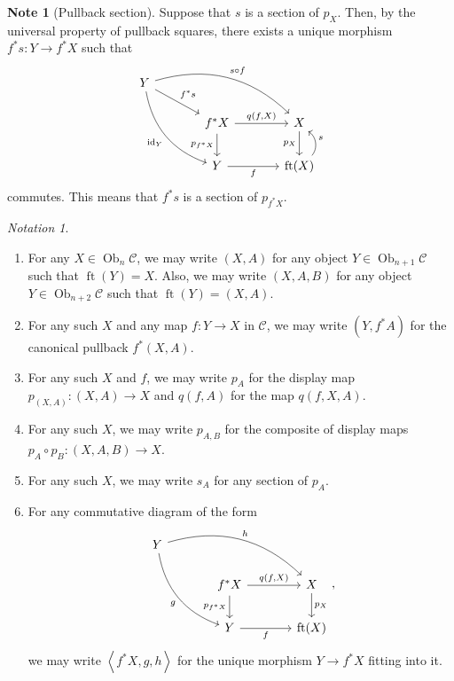 \documentclass[10pt,letterpaper,cm]{nupset}
\theoremstyle{definition}
\newtheorem{note}[definition]{Note}
\theoremstyle{theorem}
\theoremstyle{remark}
\newtheorem*{notation}{Notation}
\DeclareMathOperator{\ft}{ft}
\DeclareMathOperator{\ob}{Ob}
\newcommand{\0}{\mathbf{0}}
\newcommand{\1}{\mathbf{1}}
\newcommand{\2}{\mathbf{2}}
\renewcommand{\c}{\mathscr{C}}
\DeclareMathOperator{\idd}{id}
\newcommand{\be}{\begin{enumerate}}
\newcommand{\ee}{\end{enumerate}}
\begin{document}
\begin{note}[Pullback section]
Suppose that $s$ is a section of $p_X$. Then, by the universal property of pullback squares, there exists a unique morphism $f^{\ast}{s} : Y \to f^{\ast}{X}$ such that
\[
\begin{tikzcd}[column sep=large]
Y \arrow[rd, "f^{\ast}{s}"] \arrow[rdd, "\idd_Y"', bend right] \arrow[rrd, "s\circ f", bend left] &                                                                  &                    \\
                                                                                              & f^{\ast}{X} \arrow[d, "p_{f^{\ast}{X}}"'] \arrow[r, "{q(f,X)}"] & X \arrow[d, "p_X"'] \\
                                                                                              & Y \arrow[r, "f"']                                                & \ft(X) \arrow[u, "s"', bend right=49]         
\end{tikzcd}
\] commutes. This means that $f^{\ast}{s}$ is a section of $p_{f^{\ast}{X}}$.
\end{note}

\begin{notation}\label{bignot} $ $
\be
\item For any $X\in \ob_{n}{\c}$, we may write $\left(X, A\right)$ for any object $Y \in \ob_{n+1}{\c}$ such that $\ft(Y) = X$. Also, we may write $\left(X, A, B\right)$ for any object $Y \in \ob_{n+2}{\c}$ such that $\ft(Y) = \left(X, A\right)$. 
\item For any such $X$ and any map $f: Y \to X$ in $\c$, we may write $\left(Y, f^{\ast}{A}\right)$ for the canonical pullback $f^{\ast}(X, A)$.
\item For any such $X$ and $f$, we may write $p_A$ for the display map $p_{(X,A)} : \left(X, A\right) \to X$ and $q(f, A)$ for the map $q(f,X,A)$.
\item For any such $X$, we may write $p_{A,B}$ for the composite of display maps $p_A\circ p_B : \left(X, A, B\right) \to X$.
\item For any such $X$, we may write $s_{A}$ for any section of $p_A$.  
\item For any commutative diagram of the form
\[
\begin{tikzcd}[column sep=large]
Y  \arrow[rdd, "g"', bend right] \arrow[rrd, "h", bend left] &                                                                  &                    \\
                                                                                              & f^{\ast}{X} \arrow[d, "p_{f^{\ast}{X}}"'] \arrow[r, "{q(f,X)}"] & X \arrow[d, "p_X"] \\
                                                                                              & Y \arrow[r, "f"']                                                & \ft(X)          
\end{tikzcd}
,\] we may write $\left\langle f^{\ast}{X}, g, h \right\rangle$ for the unique morphism $Y \to f^{\ast}{X}$ fitting into it.
\ee
\end{notation}
\end{document}
